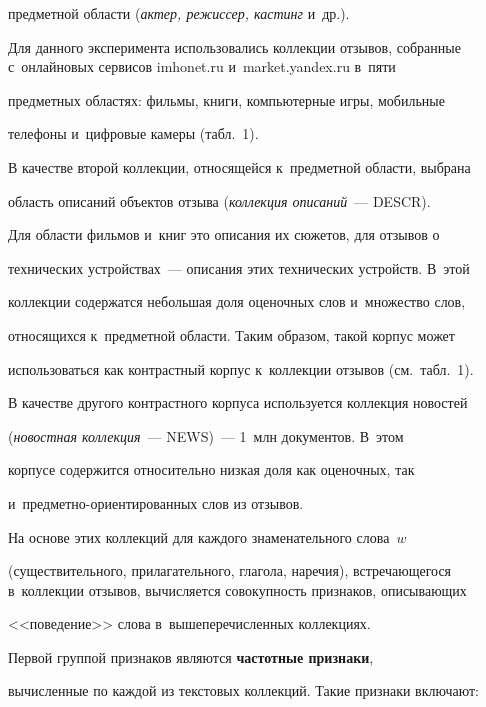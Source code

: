 предметной области (\textit{актер, режиссер, кастинг} и~др.).





Для данного эксперимента использовались коллекции отзывов, собранные с~онлайновых сервисов {\sf imhonet.ru} и~{\sf market.yandex.ru} в~пяти


предметных областях: фильмы, книги, компьютерные игры, мобильные


телефоны и~цифровые камеры (табл.~1).





В качестве второй коллекции, относящейся к~предметной области, выбрана


область описаний объектов отзыва (\textit{коллекция описаний}~--- DESCR).


Для области фильмов и~книг это описания их сюжетов, для отзывов о


технических устройствах~--- описания этих технических устройств. В~этой


коллекции содержатся небольшая доля оценочных слов и~множество слов,


относящихся к~предметной области. Таким образом, такой корпус может


использоваться как контрастный корпус к~коллекции отзывов (см.\ табл.~1).





В качестве другого контрастного корпуса используется коллекция новостей


(\textit{новостная коллекция}~--- NEWS)~--- 1~млн документов. В~этом


корпусе содержится относительно низкая доля как оценочных, так


и~пред\-мет\-но-ори\-ен\-ти\-ро\-ван\-ных слов из отзывов.





На основе этих коллекций для каждого знаменательного слова~$w$


(существительного, прилагательного, глагола, наречия), встречающегося в~коллекции отзывов, вычисляется совокупность признаков, описывающих


<<поведение>> слова в~вышеперечисленных коллекциях.





	Первой группой признаков являются \textbf{частотные признаки},


вычисленные по каждой из текстовых коллекций. Такие признаки включают:


